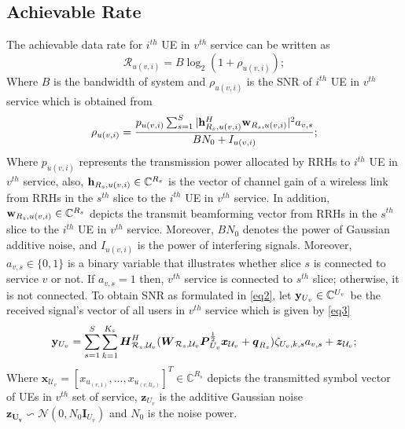 \documentclass[conference]{IEEEtran}
\begin{document}
\subsection{Achievable Rate}
The achievable data rate for $i^{th}$ UE in $v^{th}$ service can be written as 
\begin{equation}\label{eq1}
\mathcal{R}_{u(v,i)} = B \log_2({1+ \rho_{u(v,i)}});
\end{equation}
Where $B$ is the bandwidth of system and $\rho_{u(v,i)}$ is the SNR of $i^{th}$ UE in $v^{th}$ service which is obtained from 
\begin{equation}\label{eq2}
\rho_{u(v,i)} =  \frac{p_{u(v,i)}\sum_{s=1}^{S}|\bold{h}_{R_s,u(v,i)}^H \bold{w}_{R_s,u(v,i)}|^2 a_{v,s}}{BN_0 + I_{u(v,i)}};
\end{equation}
Where $p_{u(v,i)}$ represents the transmission power allocated by RRHs to $i^{th}$ UE in $v^{th}$ service, also, 
$\bold{h}_{R_s,u(v,i)} \in \mathbb{C}^{{R}_s}$ is the vector of channel gain of a wireless link from RRHs in the $s^{th}$ slice to the $i^{th}$ UE in $v^{th}$ service. In addition, $\bold{w}_{R_s,u(v,i)} \in \mathbb{C}^{{R}_s}$ depicts the  transmit beamforming vector from RRHs in the $s^{th}$ slice to the $i^{th}$ UE in $v^{th}$ service. Moreover, $BN_0$ denotes the power of Gaussian additive noise, and $I_{u(v,i)}$ is the power of interfering signals. Moreover, $a_{v,s} \in \{0,1\}$ is a binary variable that illustrates whether slice $s$ is connected to service $v$ or not. If $a_{v,s} =1$ then, $v^{th}$ service is connected to $s^{th}$ slice; otherwise, it is not connected.
\newline 
To obtain SNR as formulated in \eqref{eq2}, let $\bold{y}_{U_v}\in \mathbb{C}^{U_v} $ be the received signal's vector of all users in $v^{th}$ service which is given by \eqref{eq3}
\begin{equation}\label{eq3}
\bold{y}_{U_v} = \sum_{s = 1}^{S}\sum_{k=1}^{K_s} \boldsymbol{H}^H_{\mathcal{R}_s,\mathcal{U}_v}(\boldsymbol{W}_{\mathcal{R}_s,\mathcal{U}_v}\boldsymbol{P}_{U_v}^{\frac{1}{2}}\boldsymbol{x}_{\mathcal{U}_v}+ \boldsymbol{q}_{R_s}) \zeta_{U_v,k,s} a_{v,s}+ \boldsymbol{z}_{\mathcal{U}_v};
\end{equation}
Where $\boldsymbol{x}_{ \mathcal{U}_v} = [x_{ u_{(v,1)}},...,x_{ u_{(v,\mathcal{U}_v)}}]^T \in \mathbb{C}^{{R}_s } $ depicts the transmitted symbol vector of UEs in $v^{th}$ set of service,  $\boldsymbol{z}_{U_v}$ is the additive Gaussian noise $\boldsymbol{z_{U_v}} \backsim \mathcal{N}(0,N_0\boldsymbol{I}_{{U}_v})$ and $N_0$ is the noise power.
\end{document}
